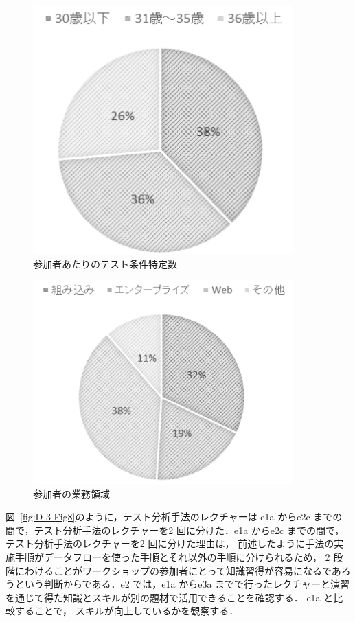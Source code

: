 \documentclass[a4paper,12pt]{jreport}
\begin{document}
\begin{figure}[h]
  \begin{center}
  \includegraphics[width=10cm]{./image/D-3-Fig6.png}
  \caption{参加者あたりのテスト条件特定数}
  \label{fig:D-3-Fig6}
  \end{center}
   \end{figure}

   \begin{figure}[h]
  \begin{center}
  \includegraphics[width=10cm]{./image/D-3-Fig7.png}
  \caption{参加者の業務領域}
  \label{fig:D-3-Fig7}
  \end{center}
   \end{figure}

図~\ref{fig:D-3-Fig8}のように，テスト分析手法のレクチャーは e1a からe2c までの間で，テスト分析手法のレクチャーを2 回に分けた．e1a からe2c までの間で，テスト分析手法のレクチャーを2 回に分けた理由は， 前述したように手法の実施手順がデータフローを使った手順とそれ以外の手順に分けられるため， 2 段階にわけることがワークショップの参加者にとって知識習得が容易になるであろうという判断からである．e2 では，e1a からe3a までで行ったレクチャーと演習を通じて得た知識とスキルが別の題材で活用できることを確認する． e1a と比較することで， スキルが向上しているかを観察する．
\end{document}
